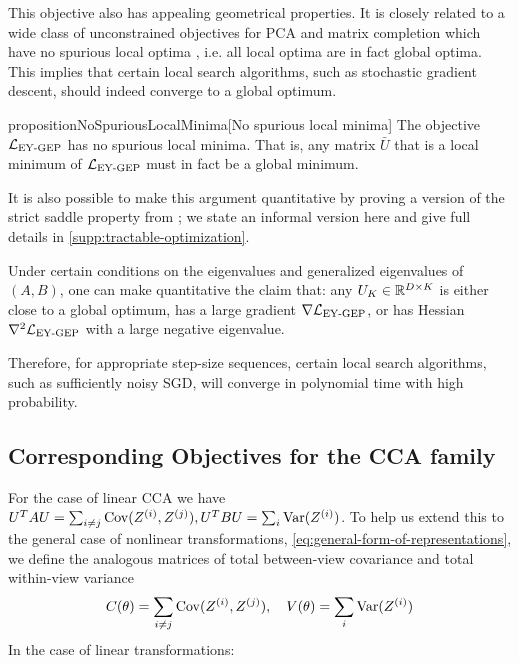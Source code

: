This objective also has appealing geometrical properties.
It is closely related to a wide class of unconstrained objectives for PCA and matrix completion which have no spurious local optima \citep{ge_no_2017}, i.e. all local optima are in fact global optima.
This implies that certain local search algorithms, such as stochastic gradient descent, should indeed converge to a global optimum.

\begin{restatable}{proposition}{NoSpuriousLocalMinima}[No spurious local minima]\label{prop:no-spurious}
The objective $\mathcal{L}_\text{EY-GEP}$ has no spurious local minima.
That is, any matrix $\bar{U}$ that is a local minimum of $\mathcal{L}_\text{EY-GEP}$ must in fact be a global minimum.
\end{restatable}

It is also possible to make this argument quantitative by proving a version of the strict saddle property from \cite{ge_no_2017,ge2015escaping}; we state an informal version here and give full details in \cref{supp:tractable-optimization}.

\begin{corollary}
    Under certain conditions on the eigenvalues and generalized eigenvalues of $(A,B)$, one can make quantitative the claim that:
    any $U_K \in \mathbb{R}^{D \times K}$ is either close to a global optimum, has a large gradient $\nabla \mathcal{L}_\text{EY-GEP}$, or has Hessian $\nabla^2 \mathcal{L}_\text{EY-GEP}$ with a large negative eigenvalue.

    Therefore, for appropriate step-size sequences, certain local search algorithms, such as sufficiently noisy SGD, will converge in polynomial time with high probability.
\end{corollary}

\subsection{Corresponding Objectives for the CCA family}
For the case of linear CCA we have $U^T A U = \sum_{i \neq j} \mathrm{Cov}(Z^{(i)}, Z^{(j)}), U^T B U = \sum_{i} \mathrm{Var}(Z^{(i)})$.
To help us extend this to the general case of nonlinear transformations, \cref{eq:general-form-of-representations}, we define the analogous matrices of total between-view covariance and total within-view variance
\begin{align}\label{eq:def-C-V-matrices}
\vphantom{\bigl(\bigr)} %
C(\theta) = \sum_{i \neq j} \Cov(Z\sps{i}, Z\sps{j}), \quad
V(\theta) = \sum_{i} \Var(Z\sps{i})
\end{align}
In the case of linear transformations:

